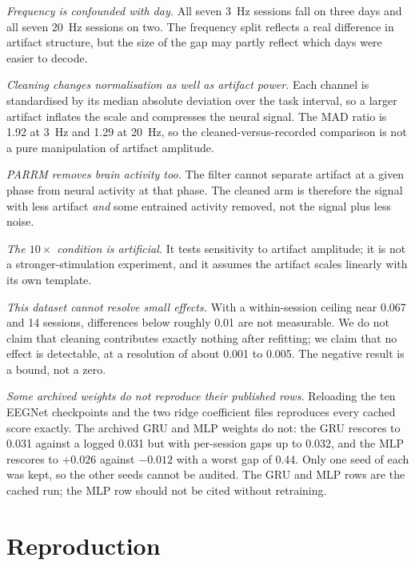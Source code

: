 \documentclass[11pt]{article}
\begin{document}
\emph{Frequency is confounded with day.} All seven 3~Hz sessions fall on three days and all
seven 20~Hz sessions on two. The frequency split reflects a real difference in artifact
structure, but the size of the gap may partly reflect which days were easier to decode.

\emph{Cleaning changes normalisation as well as artifact power.} Each channel is standardised
by its median absolute deviation over the task interval, so a larger artifact inflates the
scale and compresses the neural signal. The MAD ratio is 1.92 at 3~Hz and 1.29 at 20~Hz, so
the cleaned-versus-recorded comparison is not a pure manipulation of artifact amplitude.

\emph{PARRM removes brain activity too.} The filter cannot separate artifact at a given phase
from neural activity at that phase. The cleaned arm is therefore the signal with less artifact
\emph{and} some entrained activity removed, not the signal plus less noise.

\emph{The $10\times$ condition is artificial.} It tests sensitivity to artifact amplitude; it
is not a stronger-stimulation experiment, and it assumes the artifact scales linearly with its
own template.

\emph{This dataset cannot resolve small effects.} With a within-session ceiling near 0.067 and
14 sessions, differences below roughly 0.01 are not measurable. We do not claim that cleaning
contributes exactly nothing after refitting; we claim that no effect is detectable, at a
resolution of about 0.001 to 0.005. The negative result is a bound, not a zero.

\emph{Some archived weights do not reproduce their published rows.} Reloading the ten EEGNet
checkpoints and the two ridge coefficient files reproduces every cached score exactly. The
archived GRU and MLP weights do not: the GRU rescores to 0.031 against a logged 0.031 but with
per-session gaps up to 0.032, and the MLP rescores to $+0.026$ against $-0.012$ with a worst
gap of 0.44. Only one seed of each was kept, so the other seeds cannot be audited. The GRU and
MLP rows are the cached run; the MLP row should not be cited without retraining.

\section{Reproduction}
\label{app:repro}
\end{document}

